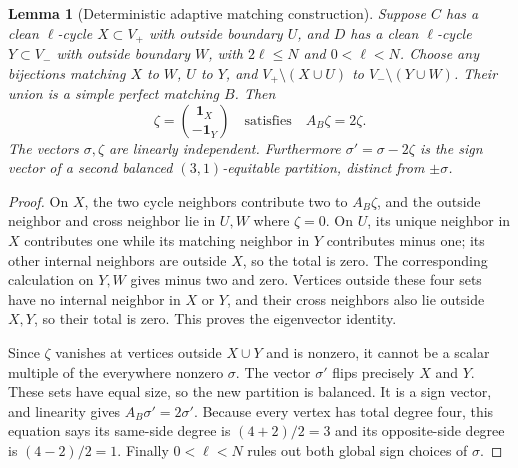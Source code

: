 \documentclass[11pt]{article}
\newtheorem{lemma}{Lemma}
\newcommand{\one}{\mathbf 1}
\begin{document}
\begin{lemma}[Deterministic adaptive matching construction]
\label{lem:construction}
Suppose $C$ has a clean $\ell$-cycle $X\subset V_+$ with outside
boundary $U$, and $D$ has a clean $\ell$-cycle $Y\subset V_-$ with
outside boundary $W$, with $2\ell\le N$ and $0<\ell<N$.
Choose any bijections matching $X$ to $W$, $U$ to $Y$, and
$V_+\setminus(X\cup U)$ to $V_-\setminus(Y\cup W)$.
Their union is a simple perfect matching $B$. Then
\[
 \zeta=\binom{\one_X}{-\one_Y}\quad\text{satisfies}\quad
 A_B\zeta=2\zeta.
\]
The vectors $\sigma,\zeta$ are linearly independent. Furthermore
$\sigma'=\sigma-2\zeta$ is the sign vector of a second balanced
$(3,1)$-equitable partition, distinct from $\pm\sigma$.
\end{lemma}
\begin{proof}
On $X$, the two cycle neighbors contribute two to $A_B\zeta$, and
the outside neighbor and cross neighbor lie in $U,W$ where $\zeta=0$.
On $U$, its unique neighbor in $X$ contributes one while its matching
neighbor in $Y$ contributes minus one; its other internal neighbors
are outside $X$, so the total is zero. The corresponding calculation
on $Y,W$ gives minus two and zero. Vertices outside these four sets
have no internal neighbor in $X$ or $Y$, and their cross neighbors
also lie outside $X,Y$, so their total is zero. This proves the
eigenvector identity.

Since $\zeta$ vanishes at vertices outside $X\cup Y$ and is nonzero,
it cannot be a scalar multiple of the everywhere nonzero $\sigma$.
The vector $\sigma'$ flips precisely $X$ and $Y$. These sets have
equal size, so the new partition is balanced. It is a sign vector,
and linearity gives $A_B\sigma'=2\sigma'$. Because every vertex
has total degree four, this equation says its same-side degree is
$(4+2)/2=3$ and its opposite-side degree is $(4-2)/2=1$.
Finally $0<\ell<N$ rules out both global sign choices of $\sigma$.
\end{proof}
\end{document}
